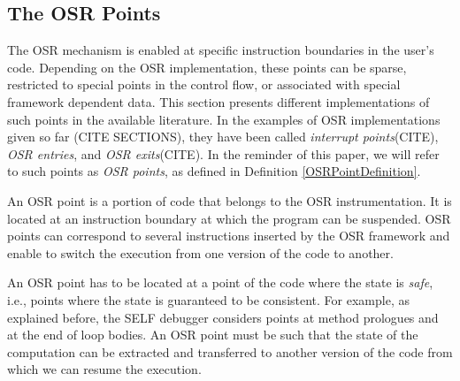 \subsection{The OSR Points}
The OSR mechanism is enabled at specific instruction boundaries in the user's code.
Depending on the OSR implementation, these points can be sparse, restricted to special points in the control flow, or associated with special framework dependent data.
This section presents different implementations of such points in the available literature.
In the examples of OSR implementations given so far (CITE SECTIONS), they have been called \textit{interrupt points}(CITE), \textit{OSR entries}, and \textit{OSR exits}(CITE).
In the reminder of this paper, we will refer to such points as \textit{OSR points}, as defined in Definition \ref{OSRPointDefinition}.

\begin{definition}\label{OSRPointDefinition}
An OSR point is a portion of code that belongs to the OSR instrumentation.
It is located at an instruction boundary at which the program can be suspended.
OSR points can correspond to several instructions inserted by the OSR framework and enable to switch the execution from one version of the code to another.
\end{definition}

An OSR point has to be located at a point of the code where the state is \textit{safe}, i.e., points where the state is guaranteed to be consistent.
For example, as explained before, the SELF debugger considers points at method prologues and at the end of loop bodies.
An OSR point must be such that the state of the computation can be extracted and transferred to another version of the code from which we can resume the execution.\\

